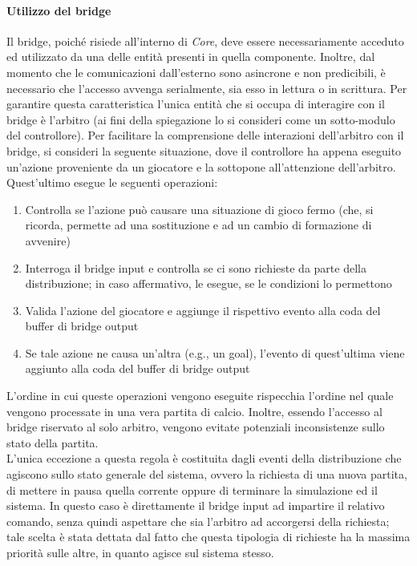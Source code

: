 \paragraph{Utilizzo del bridge}\label{sec:analisi_distribuzione_bridge_utilizzo} Il bridge, poiché risiede all'interno di \textit{Core}, deve essere necessariamente acceduto ed utilizzato da una delle entità presenti in quella componente. Inoltre, dal momento che le comunicazioni dall'esterno sono asincrone e non predicibili, è necessario che l'accesso avvenga serialmente, sia esso in lettura o in scrittura. Per garantire questa caratteristica l'unica entità che si occupa di interagire con il bridge è l'arbitro (ai fini della spiegazione lo si consideri come un sotto-modulo del controllore). Per facilitare la comprensione delle interazioni dell'arbitro con il bridge, si consideri la seguente situazione, dove il controllore ha appena eseguito un'azione proveniente da un giocatore e la sottopone all'attenzione dell'arbitro. Quest'ultimo esegue le seguenti operazioni:

\begin{enumerate}
	\item Controlla se l'azione può causare una situazione di gioco fermo (che, si ricorda, permette ad una sostituzione e ad un cambio di formazione di avvenire)
	\item Interroga il bridge input e controlla se ci sono richieste da parte della distribuzione; in caso affermativo, le esegue, se le condizioni lo permettono
	\item Valida l'azione del giocatore e aggiunge il rispettivo evento alla coda del buffer di bridge output
	\item Se tale azione ne causa un'altra (e.g., un goal), l'evento di quest'ultima viene aggiunto alla coda del buffer di bridge output
\end{enumerate}

L'ordine in cui queste operazioni vengono eseguite rispecchia l'ordine nel quale vengono processate in una vera partita di calcio. Inoltre, essendo l'accesso al bridge riservato al solo arbitro, vengono evitate potenziali inconsistenze sullo stato della partita.\\

L'unica eccezione a questa regola è costituita dagli eventi della distribuzione che agiscono sullo stato generale del sistema, ovvero la richiesta di una nuova partita, di mettere in pausa quella corrente oppure di terminare la simulazione ed il sistema. In questo caso è direttamente il bridge input ad impartire il relativo comando, senza quindi aspettare che sia l'arbitro ad accorgersi della richiesta; tale scelta è stata dettata dal fatto che questa tipologia di richieste ha la massima priorità sulle altre, in quanto agisce sul sistema stesso.

